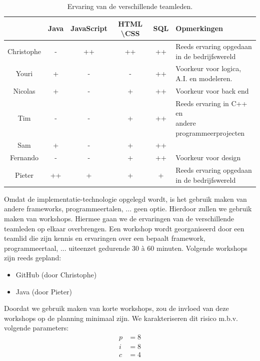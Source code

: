\begin{table} [htbp]
	\centering
  	\caption{Ervaring van de verschillende teamleden.}
    \begin{tabular}{c|ccccl}
  		  	& Java 	& JavaScript & HTML \textbackslash CSS 		& SQL 	& Opmerkingen \\
  		  	\hline
  		  	Christophe & -	& ++ 		& ++ 		& ++ & \shortstack{ Reeds ervaring opgedaan \\ in de bedrijfswereld} \\
  		  	Youri & + & - & - & ++ & \shortstack{Voorkeur voor logica, \\ A.I. en modeleren.} \\
  		  	Nicolas & + & - & + & ++ & Voorkeur voor back end \\
  		  	Tim & - & - & + & ++ & \shortstack{Reeds ervaring in C++ en \\ andere programmeerprojecten} \\
  		  	Sam & + & - & + & ++ & \\
  		  	Fernando & - & - & + & ++ & Voorkeur voor design \\
  		  	Pieter & ++ & + & + & + & \shortstack{Reeds ervaring opgedaan \\ in de bedrijfswereld}
    \end{tabular}
  	\label{tab:skilllevel}
\end{table}
Omdat de implementatie-technologie opgelegd wordt, is het gebruik maken van andere frameworks, programmeertalen, ... geen optie. Hierdoor zullen we gebruik maken van workshops. Hiermee gaan we de ervaringen van de verschillende teamleden op elkaar overbrengen. Een workshop wordt georganiseerd door een teamlid die zijn kennis en ervaringen over een bepaalt framework, programmeertaal, ... uiteenzet gedurende 30 \`{a} 60 minuten. Volgende workshops zijn reeds gepland:
\begin{itemize}
	\item GitHub (door Christophe)
	\item Java (door Pieter)
\end{itemize}
Doordat we gebruik maken van korte workshops, zou de invloed van deze workshops op de planning minimaal zijn. We karakteriseren dit risico m.b.v. volgende parameters:
\begin{align*}
	p &= 8\\
	i &= 8\\
	c &= 4
\end{align*}

